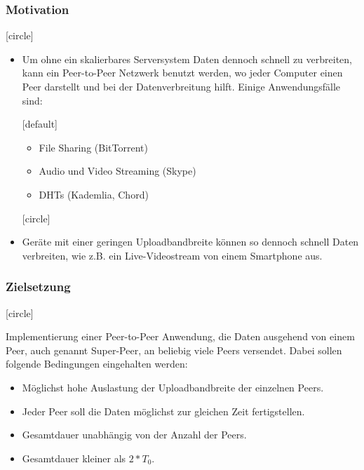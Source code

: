 \begin{frame}
  \frametitle{Motivation}

  [circle]
  \begin{itemize}
	  \item Um ohne ein skalierbares Serversystem Daten dennoch schnell zu verbreiten, kann ein Peer-to-Peer Netzwerk benutzt werden, wo jeder Computer einen Peer darstellt und bei der Datenverbreitung hilft. Einige Anwendungsfälle sind:

	  [default]
	  \begin{itemize}
	    \item File Sharing (BitTorrent)
	    \item Audio und Video Streaming (Skype)    
	    \item DHTs (Kademlia, Chord)
	  \end{itemize}

	  [circle]
	  \item Geräte mit einer geringen Uploadbandbreite können so dennoch schnell Daten verbreiten, wie z.B. ein Live-Videostream von einem Smartphone aus.
  \end{itemize}
\end{frame}


\begin{frame}
  \frametitle{Zielsetzung}

  [circle]

      Implementierung einer Peer-to-Peer Anwendung, die Daten ausgehend von einem Peer, auch genannt Super-Peer, an beliebig viele Peers versendet. Dabei sollen folgende Bedingungen eingehalten werden:

	  \begin{itemize}
	    \item Möglichst hohe Auslastung der Uploadbandbreite der einzelnen Peers.
	    \item Jeder Peer soll die Daten möglichst zur gleichen Zeit fertigstellen.
	    \item Gesamtdauer unabhängig von der Anzahl der Peers.
	    \item Gesamtdauer kleiner als $2 * T_0$.
	  \end{itemize}

\end{frame}




